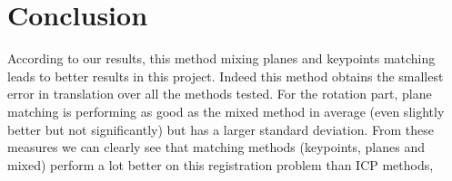 
\chapter{Conclusion}

According to our results, this method mixing planes and keypoints matching leads to better results in this project. Indeed this method obtains the smallest error in translation over all the methods tested. For the rotation part, plane matching is performing as good as the mixed method in average (even slightly better but not significantly) but has a larger standard deviation. 
From these measures we can clearly see that matching methods (keypoints, planes and mixed) perform a lot better on this registration problem than ICP methods, 